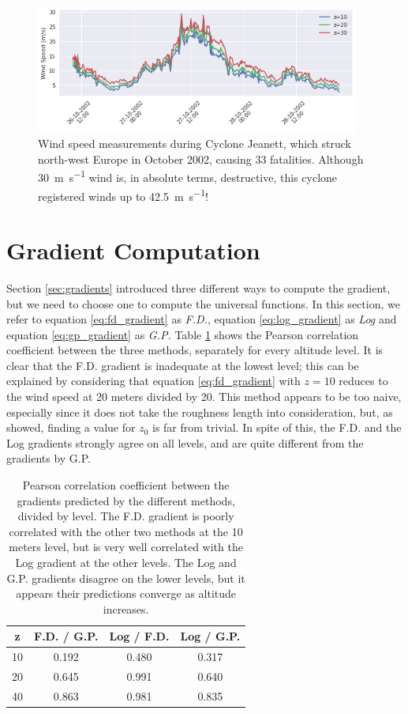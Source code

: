 \documentclass[12pt]{book}
\begin{document}
\begin{figure}
    \centering
	\includegraphics[width=0.95\textwidth]{images/cyclone_jeanett}
	\caption{Wind speed measurements during Cyclone Jeanett, which struck north-west Europe in October 2002, causing 33 fatalities. Although \SI{30}{\meter\per\second} wind is, in absolute terms, destructive, this cyclone registered winds up to \SI{42.5}{\meter\per\second}!}
	\label{fig:cyclone_jeanett}
\end{figure}



\section{Gradient Computation}
Section \ref{sec:gradients} introduced three different ways to compute the gradient, but we need to choose one to compute the universal functions. In this section, we refer to equation \ref{eq:fd_gradient} as \emph{F.D.}, equation \ref{eq:log_gradient} as \emph{Log} and equation \ref{eq:gp_gradient} as \emph{G.P.} Table \ref{tbl:gradients_corr} shows the Pearson correlation coefficient between the three methods, separately for every altitude level. It is clear that the F.D. gradient is inadequate at the lowest level; this can be explained by considering that equation \ref{eq:fd_gradient} with $z=10$ reduces to the wind speed at 20 meters divided by 20. This method appears to be too naive, especially since it does not take the roughness length into consideration, but, as \cite{cabauw_z0} showed, finding a value for $z_0$ is far from trivial. In spite of this, the F.D. and the Log gradients strongly agree on all levels, and are quite different from the gradients by G.P.

\begin{table}[]
\centering
\caption{Pearson correlation coefficient between the gradients predicted by the different methods, divided by level. The F.D. gradient is poorly correlated with the other two methods at the 10 meters level, but is very well correlated with the Log gradient at the other levels. The Log and G.P. gradients disagree on the lower levels, but it appears their predictions converge as altitude increases.}
\label{tbl:gradients_corr}
\begin{tabular}{c|c|c|c}
z & F.D. / G.P. & Log / F.D. & Log / G.P. \\ \hline
 	10 & 	0.192 & 0.480 &	0.317 \\
 	20 &	0.645 	& 0.991 &	0.640 \\
 	40 &	0.863 & 0.981 &	0.835 \\
\end{tabular}
\end{table}
\end{document}
